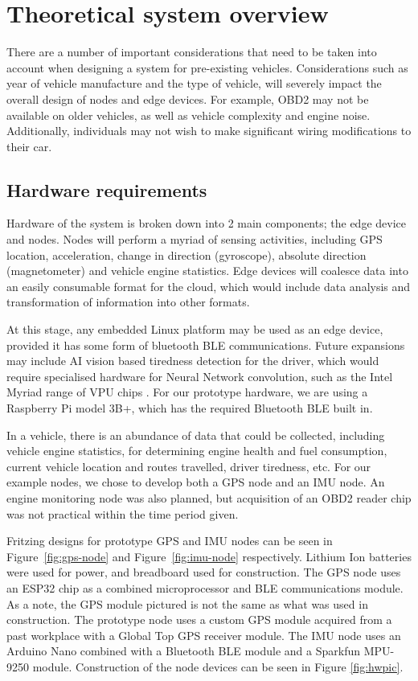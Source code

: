 \documentclass[DIV=current]{scrartcl}
\begin{document}
	\section{Theoretical system overview}
	There are a number of important considerations that need to be taken into account when designing a system for pre-existing vehicles. Considerations such as year of vehicle manufacture and the type of vehicle, will severely impact the overall design of nodes and edge devices. For example, OBD2 may not be available on older vehicles, as well as vehicle complexity and engine noise. Additionally, individuals may not wish to make significant wiring modifications to their car.
	
	\subsection{Hardware requirements}
	Hardware of the system is broken down into 2 main components; the edge device and nodes. Nodes will perform a myriad of sensing activities, including GPS location, acceleration, change in direction (gyroscope), absolute direction (magnetometer) and vehicle engine statistics. Edge devices will coalesce data into an easily consumable format for the cloud, which would include data analysis and transformation of information into other formats.
	
	At this stage, any embedded Linux platform may be used as an edge device, provided it has some form of bluetooth BLE communications. Future expansions may include AI vision based tiredness detection for the driver, which would require specialised hardware for Neural Network convolution, such as the Intel Myriad range of VPU chips \cite{_intel_}. For our prototype hardware, we are using a Raspberry Pi model 3B+, which has the required Bluetooth BLE built in.
	
	In a vehicle, there is an abundance of data that could be collected, including vehicle engine statistics, for determining engine health and fuel consumption, current vehicle location and routes travelled, driver tiredness, etc. For our example nodes, we chose to develop both a GPS node and an IMU node. An engine monitoring node was also planned, but acquisition of an OBD2 reader chip was not practical within the time period given.
	
	Fritzing designs for prototype GPS and IMU nodes can be seen in Figure~\ref{fig:gps-node} and Figure~\ref{fig:imu-node} respectively. Lithium Ion batteries were used for power, and breadboard used for construction. The GPS node uses an ESP32 chip as a combined microprocessor and BLE communications module. As a note, the GPS module pictured is not the same as what was used in construction. The prototype node uses a custom GPS module acquired from a past workplace with a Global Top GPS receiver module. The IMU node uses an Arduino Nano combined with a Bluetooth BLE module\cite{_arduino_} and a Sparkfun MPU-9250 module\cite{_mpu9250_}. Construction of the node devices can be seen in Figure \ref{fig:hwpic}.
	
\end{document}
